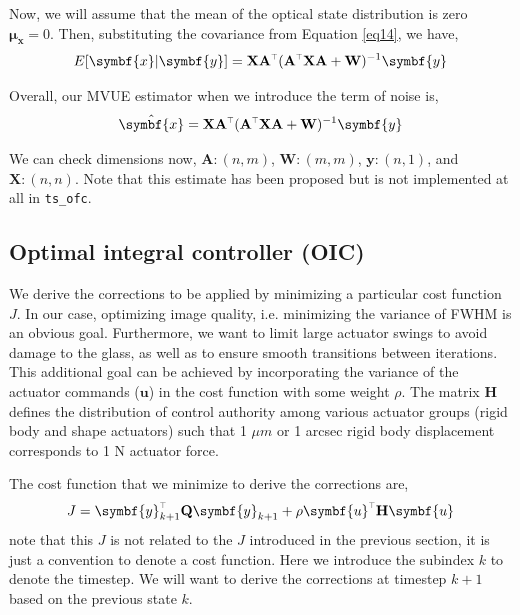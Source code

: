 \documentclass[SE,authoryear,toc]{lsstdoc}
\renewcommand{\v}[1]{\mathbf{#1}}
\newcommand{\tr}{\scalebox{0.6}{$\top$}}
\begin{document}
Now, we will assume that the mean of the optical state distribution is zero $\symbf{\mu_x} = 0$. Then, substituting the covariance from Equation \ref{eq14}, we have, 
\begin{equation}
    E[\symbf{x} | \symbf{y}] = \v{X}\v{A}^{\tr}(\v{A}^{\tr}\v{X}\v{A} + \v{W})^{-1} \symbf{y}
\end{equation}

Overall, our MVUE estimator when we introduce the term of noise is, 
\begin{equation}
    \hat{\symbf{x}} = \v{X}\v{A}^{\tr}(\v{A}^{\tr}\v{X}\v{A} + \v{W})^{-1} \symbf{y}
\end{equation}

We can check dimensions now, $\v{A}: (n, m)$, $\v{W}: (m, m)$, $\symbf{y}: (n, 1)$, and $\v{X}: (n, n)$. Note that this estimate has been proposed but is not implemented at all in \texttt{ts\_ofc}.



\subsection*{Optimal integral controller (OIC)}
We derive the corrections to be applied by minimizing a particular cost function $J$. In our case, optimizing image quality, i.e. minimizing the variance of FWHM is an obvious goal. Furthermore, we want to limit large actuator swings to avoid damage to the glass, as well as to ensure smooth transitions between iterations. This additional goal can be achieved by incorporating the variance of the actuator commands ($\symbf{u}$) in the cost function with some weight $\rho$. The matrix $\v{H}$ defines the distribution of control authority among various actuator groups (rigid body and shape actuators) such that 1 $\mu m$ or 1 arcsec rigid body displacement corresponds to 1 N actuator force. 

The cost function that we minimize to derive the corrections are, 
\begin{equation}
    J = \symbf{y}_{k+1}^{\tr}\v{Q}\symbf{y}_{k+1} + \rho \symbf{u}^{\tr}\v{H}\symbf{u}
\end{equation}
note that this $J$ is not related to the $J$ introduced in the previous section, it is just a convention to denote a cost function. Here we introduce the subindex $k$ to denote the timestep. We will want to derive the corrections at timestep $k+1$ based on the previous state $k$.
\end{document}
